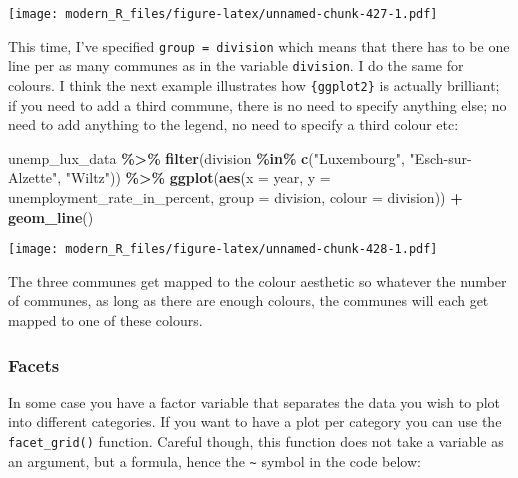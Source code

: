 \documentclass[
]{article}
\newenvironment{Shaded}{\begin{snugshade}}{\end{snugshade}}
\newcommand{\DataTypeTok}[1]{\textcolor[rgb]{0.13,0.29,0.53}{#1}}
\newcommand{\KeywordTok}[1]{\textcolor[rgb]{0.13,0.29,0.53}{\textbf{#1}}}
\newcommand{\NormalTok}[1]{#1}
\newcommand{\OperatorTok}[1]{\textcolor[rgb]{0.81,0.36,0.00}{\textbf{#1}}}
\newcommand{\StringTok}[1]{\textcolor[rgb]{0.31,0.60,0.02}{#1}}
\begin{document}
\texttt{[image: modern\_R\_files/figure-latex/unnamed-chunk-427-1.pdf]}

This time, I've specified \texttt{group\ =\ division} which means that there has to be one line per as many
communes as in the variable \texttt{division}. I do the same for colours. I think the next example
illustrates how \texttt{\{ggplot2\}} is actually brilliant; if you need to add a third commune, there is no
need to specify anything else; no need to add anything to the legend, no need to specify a third
colour etc:

\begin{Shaded}
\begin{Highlighting}[]
\NormalTok{unemp\_lux\_data }\OperatorTok{\%\textgreater{}\%}
\StringTok{  }\KeywordTok{filter}\NormalTok{(division }\OperatorTok{\%in\%}\StringTok{ }\KeywordTok{c}\NormalTok{(}\StringTok{"Luxembourg"}\NormalTok{, }\StringTok{"Esch{-}sur{-}Alzette"}\NormalTok{, }\StringTok{"Wiltz"}\NormalTok{)) }\OperatorTok{\%\textgreater{}\%}
\StringTok{  }\KeywordTok{ggplot}\NormalTok{(}\KeywordTok{aes}\NormalTok{(}\DataTypeTok{x =}\NormalTok{ year, }\DataTypeTok{y =}\NormalTok{ unemployment\_rate\_in\_percent, }\DataTypeTok{group =}\NormalTok{ division, }\DataTypeTok{colour =}\NormalTok{ division)) }\OperatorTok{+}
\StringTok{  }\KeywordTok{geom\_line}\NormalTok{()}
\end{Highlighting}
\end{Shaded}

\texttt{[image: modern\_R\_files/figure-latex/unnamed-chunk-428-1.pdf]}

The three communes get mapped to the colour aesthetic so whatever the number of communes, as long
as there are enough colours, the communes will each get mapped to one of these colours.

\hypertarget{facets}{%
\subsubsection{Facets}\label{facets}}

In some case you have a factor variable that separates the data you wish to plot into different
categories. If you want to have a plot per category you can use the \texttt{facet\_grid()} function.
Careful though, this function does not take a variable as an argument, but a formula, hence the \texttt{\textasciitilde{}}
symbol in the code below:
\end{document}
